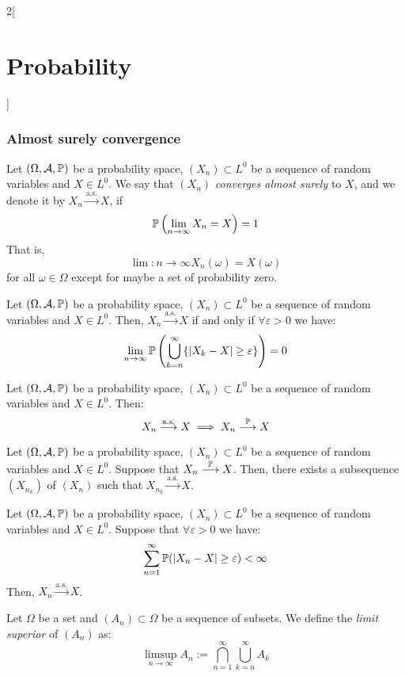 \documentclass[../../../main.tex]{subfiles}
\begin{document}
\begin{multicols}{2}[\section{Probability}]
    \subsubsection{Almost surely convergence}
    \begin{definition}
        Let $(\Omega,\mathcal{A},\mathbb{P})$ be a probability space, $(X_n)\subset L^0$ be a sequence of random variables and $X\in L^0$. We say that $(X_n)$ \textit{converges almost surely} to $X$, and we denote it by $X_n\overset{\text{a.s.}}{\longrightarrow} X$, if $$\mathbb{P}\left(\lim_{n\to\infty}X_n=X\right)=1$$ That is, $$\lim:{n\to\infty}X_n(\omega)=X(\omega)$$ for all $\omega\in\Omega$ except for maybe a set of probability zero.
    \end{definition}
    \begin{prop}
        Let $(\Omega,\mathcal{A},\mathbb{P})$ be a probability space, $(X_n)\subset L^0$ be a sequence of random variables and $X\in L^0$. Then, $X_n\overset{\text{a.s.}}{\longrightarrow} X$ if and only if $\forall \varepsilon>0$ we have: $$\lim_{n\to\infty}\mathbb{P}\left(\bigcup_{k=n}^\infty\{|X_k-X|\geq\varepsilon\}\right)=0$$
    \end{prop}
    \begin{prop}
        Let $(\Omega,\mathcal{A},\mathbb{P})$ be a probability space, $(X_n)\subset L^0$ be a sequence of random variables and $X\in L^0$. Then:
        $$X_n\overset{\text{a.s.}}{\longrightarrow} X\implies X_n\overset{\mathbb{P}}{\longrightarrow} X$$
    \end{prop}
    \begin{prop}
        Let $(\Omega,\mathcal{A},\mathbb{P})$ be a probability space, $(X_n)\subset L^0$ be a sequence of random variables and $X\in L^0$. Suppose that $X_n\overset{\mathbb{P}}{\longrightarrow} X$. Then, there exists a subsequence $(X_{n_k})$ of $(X_n)$ such that $X_{n_k}\overset{\text{a.s.}}{\longrightarrow} X$.
    \end{prop}
    \begin{prop}
        Let $(\Omega,\mathcal{A},\mathbb{P})$ be a probability space, $(X_n)\subset L^0$ be a sequence of random variables and $X\in L^0$. Suppose that $\forall\varepsilon >0$ we have: $$\sum_{n=1}^\infty\mathbb{P}(|X_n-X|\geq\varepsilon)<\infty$$
        Then, $X_n\overset{\text{a.s.}}{\longrightarrow} X$.
    \end{prop}
    \begin{definition}
        Let $\Omega$ be a set and $(A_n)\subset\Omega$ be a sequence of subsets. We define the \textit{limit superior} of $(A_n)$ as: $$\limsup_{n\to\infty}A_n:=\bigcap_{n=1}^\infty\bigcup_{k=n}^\infty A_k$$

\end{definition}
\end{multicols}
\end{document}
